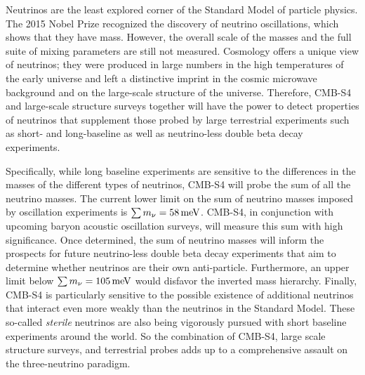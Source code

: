 Neutrinos are the least explored corner of the Standard Model of particle physics.  The 2015 Nobel Prize recognized the discovery of neutrino oscillations, which shows that they have mass. However, the overall scale of the masses and the full suite of mixing parameters are still not measured.  Cosmology offers a unique view of neutrinos; they were produced in large numbers in the high temperatures of the early universe and left a distinctive imprint in the cosmic microwave background and on the large-scale structure of the universe. Therefore, CMB-S4 and large-scale structure surveys together will have the power to detect properties of neutrinos that supplement those probed by large terrestrial experiments such as short- and long-baseline as well as neutrino-less double beta decay experiments.


Specifically, while long baseline experiments are sensitive to the differences in the masses of the different types of neutrinos, CMB-S4  will probe the sum of all the neutrino masses. The current lower limit on the sum of neutrino masses imposed by oscillation experiments is \mbox{$\sum m_\nu=58\,\rm{meV}$}. CMB-S4, in conjunction with upcoming baryon acoustic oscillation surveys, will measure this sum with high significance. Once determined, the sum of neutrino masses will inform the prospects for future neutrino-less double beta decay experiments that aim to determine whether neutrinos are their own anti-particle. Furthermore, an upper limit below \mbox{$\sum m_\nu=105\,\rm{meV}$} would disfavor the inverted mass hierarchy. Finally, CMB-S4 is particularly sensitive to the possible existence of additional neutrinos that interact even more weakly than the neutrinos in the Standard Model. These so-called {\it sterile} neutrinos are also being vigorously pursued with short baseline experiments around the world. So the combination of CMB-S4, large scale structure surveys, and terrestrial probes adds up to a comprehensive assault on the three-neutrino paradigm.

